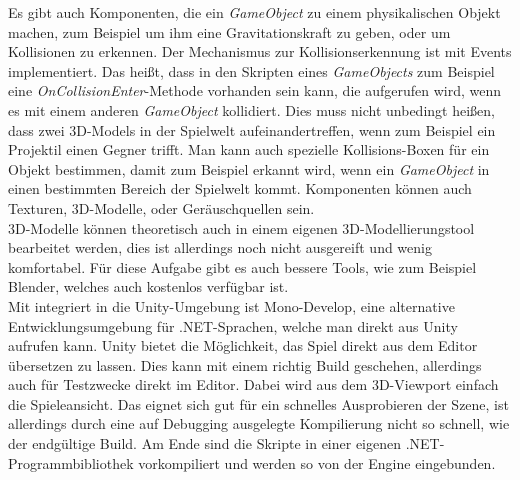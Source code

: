 Es gibt auch Komponenten, die ein \textit{GameObject} zu einem physikalischen Objekt machen, zum Beispiel um ihm eine Gravitationskraft zu geben, oder um Kollisionen zu erkennen. Der Mechanismus zur Kollisionserkennung ist mit Events implementiert. Das heißt, dass in den Skripten eines \textit{GameObjects} zum Beispiel eine \textit{OnCollisionEnter}-Methode vorhanden sein kann, die aufgerufen wird, wenn es mit einem anderen \textit{GameObject} kollidiert. Dies muss nicht unbedingt heißen, dass zwei 3D-Models in der Spielwelt aufeinandertreffen, wenn zum Beispiel ein Projektil einen Gegner trifft. Man kann auch spezielle Kollisions-Boxen für ein Objekt bestimmen, damit zum Beispiel erkannt wird, wenn ein \textit{GameObject} in einen bestimmten Bereich der Spielwelt kommt. Komponenten können auch Texturen, 3D-Modelle, oder Geräuschquellen sein.\\
3D-Modelle können theoretisch auch in einem eigenen 3D-Modellierungstool bearbeitet werden, dies ist allerdings noch nicht ausgereift und wenig komfortabel. Für diese Aufgabe gibt es auch bessere Tools, wie zum Beispiel Blender, welches auch kostenlos verfügbar ist.\\
Mit integriert in die Unity-Umgebung ist Mono-Develop, eine alternative Entwicklungsumgebung für .NET-Sprachen, welche man direkt aus Unity aufrufen kann. Unity bietet die Möglichkeit, das Spiel direkt aus dem Editor übersetzen zu lassen. Dies kann mit einem richtig Build geschehen, allerdings auch für Testzwecke direkt im Editor. Dabei wird aus dem 3D-Viewport einfach die Spieleansicht. Das eignet sich gut für ein schnelles Ausprobieren der Szene, ist allerdings durch eine auf Debugging ausgelegte Kompilierung nicht so schnell, wie der endgültige Build. Am Ende sind die Skripte in einer eigenen .NET-Programmbibliothek vorkompiliert und werden so von der Engine eingebunden.

